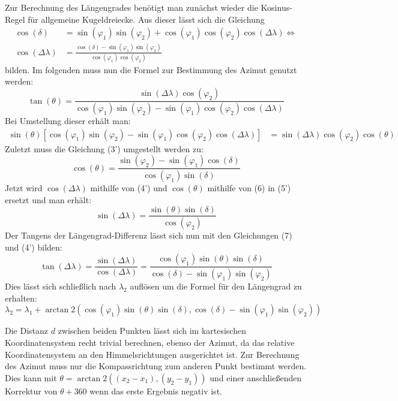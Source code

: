 Zur Berechnung des Längengrades benötigt man zunächst wieder die Kosinus-Regel für allgemeine Kugeldreiecke. Aus dieser lässt sich die Gleichung
\begin{align}
\tag{4}
\cos(\delta) &= \sin(\varphi_1)\sin(\varphi_2) + \cos(\varphi_1)\cos(\varphi_2)\cos(\Delta\lambda) \Leftrightarrow \\
\tag{4'}
\cos(\Delta\lambda) &= \frac{\cos(\delta) - \sin(\varphi_1)\sin(\varphi_2)}{
\cos(\varphi_1)\cos(\varphi_2)}
\end{align}
bilden. Im folgenden muss nun die Formel zur Bestimmung des Azimut \cite{veness_chris_calculate_2002} genutzt werden:
\begin{equation}
\tag{5}
\tan(\theta) = \frac{\sin(\Delta\lambda)\cos(\varphi_2)}{\cos(\varphi_1)\sin(\varphi_2)-\sin(\varphi_1)\cos(\varphi_2)\cos(\Delta\lambda)}
\end{equation}
Bei Umstellung dieser erhält man:
\begin{align}
\tag{5'}
\sin(\theta)\left[
\cos(\varphi_1)\sin(\varphi_2) - \sin(\varphi_1)\cos(\varphi_2)\cos(\Delta\lambda)\right]
 &=
\sin(\Delta\lambda)\cos(\varphi_2)\cos(\theta)
\end{align}
Zuletzt muss die Gleichung (3') umgestellt werden zu:
\begin{equation}
\tag{6}
\cos(\theta) = \frac{\sin(\varphi_2) - \sin(\varphi_1)\cos(\delta)}{\cos(\varphi_1)\sin(\delta)}
\end{equation}
Jetzt wird $\cos(\Delta\lambda)$ mithilfe von (4') und $\cos(\theta)$ mithilfe von (6) in (5') ersetzt und man erhält:
\begin{equation}
\tag{7}
\sin(\Delta\lambda) = \frac{\sin(\theta)\sin(\delta)}{\cos(\varphi_2)}
\end{equation}
Der Tangens der Längengrad-Differenz lässt sich nun mit den Gleichungen (7) und (4') bilden:
$$
\tan(\Delta\lambda) = \frac{\sin(\Delta\lambda)}{\cos(\Delta\lambda)}
=
\frac{\cos(\varphi_1)\sin(\theta)\sin(\delta)}{\cos(\delta) - \sin(\varphi_1)\sin(\varphi_2)}
$$
Dies lässt sich schließlich nach $\lambda_2$ auflösen um die Formel für den Längengrad zu erhalten:
\begin{equation}
\tag{2}
\lambda_2 = \lambda_1 + \arctan2\left(\cos(\varphi_1)\sin(\theta)\sin(\delta), \cos(\delta) - \sin(\varphi_1)\sin(\varphi_2)\right)
\end{equation}

Die Distanz $d$ zwischen beiden Punkten lässt sich im kartesischen Koordinatensystem recht trivial berechnen, ebenso der Azimut, da das relative Koordinatensystem an den Himmelsrichtungen ausgerichtet ist. Zur Berechnung des Azimut muss nur die Kompassrichtung zum anderen Punkt bestimmt werden. Dies kann mit $\theta = \arctan2((x_2 - x_1), (y_2 - y_1))$ und einer anschließenden Korrektur von $\theta + 360$ wenn das erste Ergebnis negativ ist.

